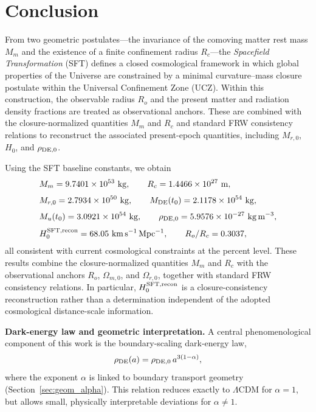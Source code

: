 \documentclass[12pt]{article}
\begin{document}
\section{Conclusion}
\label{sec:conclusion}

From two geometric postulates—the invariance of the comoving matter rest mass \(M_m\) and the existence of a finite confinement radius \(R_c\)—the \emph{Spacefield Transformation} (SFT) defines a closed cosmological framework in which global properties of the Universe are constrained by a minimal
curvature--mass closure postulate within the Universal Confinement Zone (UCZ).  
Within this construction, the observable radius \(R_o\) and the present
matter and radiation density fractions are treated as observational anchors.
These are combined with the closure-normalized quantities \(M_m\) and \(R_c\)
and standard FRW consistency relations to reconstruct the associated
present-epoch quantities, including \(M_{r,0}\), \(H_0\), and
\(\rho_{\rm DE,0}\).

Using the SFT baseline constants, we obtain
\[
\begin{aligned}
&M_m = 9.7401\times10^{53}\ {\rm kg},\qquad
R_c = 1.4466\times10^{27}\ {\rm m},\\[3pt]
&M_{r,0}=2.7934\times10^{50}\ {\rm kg},\qquad
M_{\rm DE}(t_0)=2.1178\times10^{54}\ {\rm kg},\\[3pt]
&M_u(t_0)=3.0921\times10^{54}\ {\rm kg},\qquad
\rho_{\rm DE,0}=5.9576\times10^{-27}\ {\rm kg\,m^{-3}},\\[3pt]
&H_0^{\mathrm{SFT,recon}}
=
68.05~{\rm km\,s^{-1}\,Mpc^{-1}},\qquad
R_o/R_c = 0.3037,
\end{aligned}
\]
all consistent with current cosmological constraints at the percent level.  
These results combine the closure-normalized quantities \(M_m\) and
\(R_c\) with the observational anchors \(R_o\),
\(\Omega_{m,0}\), and \(\Omega_{r,0}\), together with standard FRW
consistency relations. In particular,
\(H_0^{\rm SFT,recon}\) is a closure-consistency reconstruction rather
than a determination independent of the adopted cosmological
distance-scale information.

\medskip
\noindent
\textbf{Dark-energy law and geometric interpretation.}  
A central phenomenological component of this work is the boundary-scaling dark-energy law,
\[
\rho_{\rm DE}(a)=\rho_{\rm DE,0}\,a^{3(1-\alpha)},
\]
where the exponent \(\alpha\) is linked to boundary transport geometry (Section~\ref{sec:geom_alpha}).  
This relation reduces exactly to $\Lambda$CDM for $\alpha=1$, but allows small, physically interpretable deviations for $\alpha\neq1$.
\end{document}
